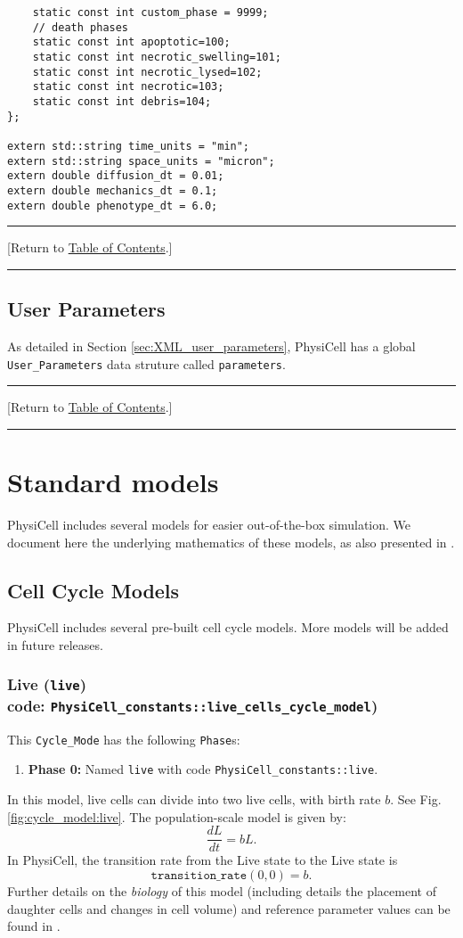\documentclass[12pt]{article}
\newcommand{\beq}{\begin{equation}}
\newcommand{\eeq}{\end{equation}}
\renewcommand{\v}{\verb}
\newcommand{\blue}[1]{\textcolor{blue}{#1}}
\newcommand{\DONE}{}%
\newcommand{\TOClink}{\begin{center}\hrule\vskip-5pt\phantom{.}\hfill[Return to \hyperlink{TOC}{Table of Contents}.]\hfill\phantom{.}\vskip3pt\hrule\end{center}}
\begin{document}
\begin{verbatim}
    static const int custom_phase = 9999;
    // death phases
    static const int apoptotic=100;
    static const int necrotic_swelling=101;
    static const int necrotic_lysed=102;
    static const int necrotic=103; 
    static const int debris=104; 
};

extern std::string time_units = "min";
extern std::string space_units = "micron";
extern double diffusion_dt = 0.01; 
extern double mechanics_dt = 0.1;
extern double phenotype_dt = 6.0;
\end{verbatim}

\TOClink 

\subsection{User Parameters}
\label{sec:global_user_parameters}
As detailed in Section \ref{sec:XML_user_parameters}, PhysiCell has a global 
\v|User_Parameters| data struture called \v|parameters|. 
\TOClink 

\section{Standard models \DONE}
\label{sec:Standard_Models}
PhysiCell includes several models for easier out-of-the-box simulation. 
We document here the underlying mathematics of these models, as also 
presented in \cite{ref:PhysiCell}. 

\subsection{Cell Cycle Models \DONE}
\label{sec:Standard_Models:Cycle}
PhysiCell includes several pre-built cell cycle models. More models 
will be added in future releases. 

\subsubsection{Live (\texttt{live})\\
code: \texttt{PhysiCell\_constants::live\_cells\_cycle\_model})}
\label{sec:Standard_Models:Live}
This \v|Cycle_Mode| has the following \v|Phase|s: 
\begin{enumerate}
\item 
\textbf{Phase 0:} Named \v|live| with code \v|PhysiCell_constants::live|. 
\end{enumerate}
In this model, live cells can divide into two live cells, with 
birth rate $b$. See Fig. \ref{fig:cycle_model:live}. The 
population-scale model is given by: 
\beq
\frac{dL}{dt} = b L. 
\eeq
In PhysiCell, the transition rate 
from the Live state to the Live state is 
\beq
\texttt{transition\_rate}(0,0) = b. 
\eeq
Further details on the \emph{biology} of this model (including 
details the placement of daughter cells and changes in cell 
volume) and reference parameter values can be found in \cite{ref:PhysiCell}. 
\end{document}
